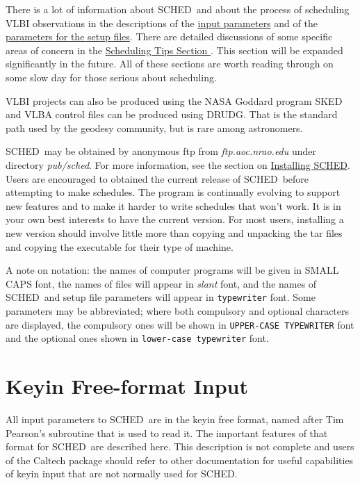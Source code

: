 \documentclass{report}
\newcommand{\sched}{{\sc SCHED}}
\newcommand{\schedb}{{\sc SCHED~}}
\begin{document}
There is a lot of information about \schedb and about the process of
scheduling VLBI observations in the descriptions of the
\hyperref[SEC:SCHPAR]{input parameters}
and of the
\hyperref[SSEC:SETLST]{parameters for the setup files}.
There are detailed discussions of
some specific areas of concern in the
\hyperref[SEC:TIPS]{Scheduling Tips Section }.
This section will be expanded significantly in the future.  All of these
sections are worth reading through on some slow day for those serious
about scheduling.

VLBI projects can also be produced using the NASA Goddard program {\sc
SKED} and VLBA control files can be produced using {\sc DRUDG}.  That
is the standard path used by the geodesy community, but is rare among
astronomers.

\schedb may be obtained by anonymous ftp from {\sl ftp.aoc.nrao.edu}
under directory {\sl pub/sched}.  For more information, see the
section on
\hyperref[SEC:INSTALL]{Installing \sched}.
Users are encouraged to obtained the current release
of \schedb before attempting to make schedules.  The program is
continually evolving to support new features and to make it harder
to write schedules that won't work.  It is in your own best interests
to have the current version.  For most users, installing a new
version should involve little more than copying and unpacking the tar
files and copying the executable for their type of machine.

A note on notation: the names of computer programs will be given in
{\sc SMALL CAPS} font, the names of files will appear in {\sl slant}
font, and the names of \schedb and setup file parameters will
appear in {\tt typewriter} font. Some parameters may be abbreviated;
where both compulsory and optional characters are displayed, the
compulsory ones will be shown in {\tt UPPER-CASE TYPEWRITER} font and
the optional ones shown in {\tt lower-case typewriter} font.



\section{\label{SEC:KEYIN}Keyin Free-format Input}

All input parameters to \schedb are in the keyin free format, named
after Tim Pearson's subroutine that is used to read it. The important
features of that format for \schedb are described here. This
description is not complete and users of the Caltech package
should refer to other documentation for useful capabilities of keyin
input that are not normally used for \sched.
\end{document}
